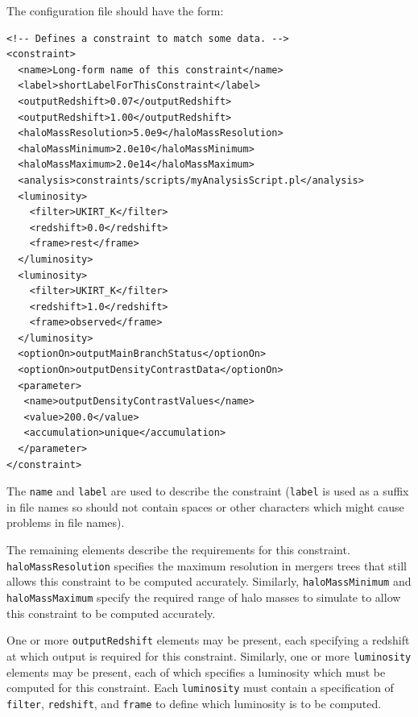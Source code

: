 The configuration file should have the form:
\begin{verbatim}
<!-- Defines a constraint to match some data. -->                                          
<constraint>                                                                                                         
  <name>Long-form name of this constraint</name>                                                                      
  <label>shortLabelForThisConstraint</label>                                                                        
  <outputRedshift>0.07</outputRedshift>                                                                              
  <outputRedshift>1.00</outputRedshift>                                                                              
  <haloMassResolution>5.0e9</haloMassResolution>                                                                     
  <haloMassMinimum>2.0e10</haloMassMinimum>                                                                          
  <haloMassMaximum>2.0e14</haloMassMaximum>                                                                          
  <analysis>constraints/scripts/myAnalysisScript.pl</analysis>                                         
  <luminosity>
    <filter>UKIRT_K</filter>
    <redshift>0.0</redshift>
    <frame>rest</frame>
  </luminosity>
  <luminosity>
    <filter>UKIRT_K</filter>
    <redshift>1.0</redshift>
    <frame>observed</frame>
  </luminosity>
  <optionOn>outputMainBranchStatus</optionOn>
  <optionOn>outputDensityContrastData</optionOn>
  <parameter>
   <name>outputDensityContrastValues</name>
   <value>200.0</value>
   <accumulation>unique</accumulation>
  </parameter>
</constraint>                                                                                                        
\end{verbatim}
The {\tt name} and {\tt label} are used to describe the constraint ({\tt label} is used as a suffix in file names so should not contain spaces or other characters which might cause problems in file names). 

The remaining elements describe the requirements for this constraint. {\tt haloMassResolution} specifies the maximum resolution in mergers trees that still allows this constraint to be computed accurately. Similarly, {\tt haloMassMinimum} and {\tt haloMassMaximum} specify the required range of halo masses to simulate to allow this constraint to be computed accurately.

One or more {\tt outputRedshift} elements may be present, each specifying a redshift at which output is required for this constraint. Similarly, one or more {\tt luminosity} elements may be present, each of which specifies a luminosity which must be computed for this constraint. Each {\tt luminosity} must contain a specification of {\tt filter}, {\tt redshift}, and {\tt frame} to define which luminosity is to be computed.

